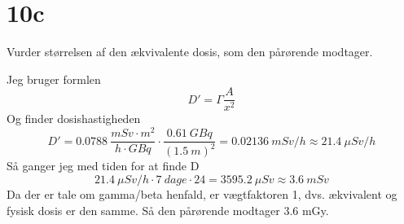 \documentclass[12pt]{article}
\begin{document}
\section*{10c}

Vurder størrelsen af den ækvivalente dosis, som den pårørende modtager.

Jeg bruger formlen
$$D' = \Gamma \frac{A}{x^2}$$
Og finder dosishastigheden
$$D' = 0.0788\ \frac{mSv\cdot m^2}{h\cdot GBq}\cdot \frac{0.61\ GBq}{(1.5\ m)^2} = 0.02136\ mSv/h \approx 21.4\ \mu Sv/h$$
Så ganger jeg med tiden for at finde D
$$21.4\ \mu Sv/h \cdot 7\ dage\cdot 24 = 3595.2\ \mu Sv \approx 3.6\ mSv$$
Da der er tale om gamma/beta henfald, er vægtfaktoren 1, dvs. ækvivalent og fysisk dosis er den samme.
Så den pårørende modtager 3.6 mGy.
\end{document}

